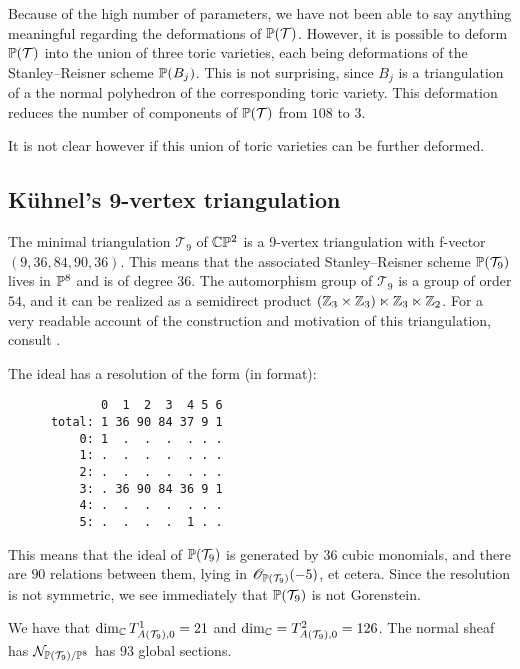 Because of the high number of parameters, we have not been able to say anything meaningful regarding the deformations of $\P(\mathcal T)$. However, it is possible to deform $\P(\mathcal T)$ into the union of three toric varieties, each being deformations of the Stanley--Reisner scheme $\P(B_j)$. This is not surprising, since $B_j$ is a triangulation of a the normal polyhedron of the corresponding toric variety. This deformation reduces the number of components of $\P(\mathcal T)$ from $108$ to $3$.

It is not clear however if this union of toric varieties can be further deformed.

\subsection{Kühnel's 9-vertex triangulation}

The minimal triangulation $\mathcal T_9$ of $\C \P^2$ is a 9-vertex triangulation with f-vector $(9,36,84,90,36)$. This means that the associated Stanley--Reisner scheme $\P(\mathcal T_9)$ lives in $\P^8$ and is of degree $36$. The automorphism group of $\mathcal T_9$ is a group of order $54$, and it can be realized as a semidirect product $(\Z_3 \times \Z_3) \ltimes \Z_3 \ltimes \Z_2$. For a very readable account of the construction and motivation of this triangulation, consult \cite{kuhnel_9vertex}.

The ideal has a resolution of the form (in \MM format):

\begin{verbatim}
             0  1  2  3  4 5 6
      total: 1 36 90 84 37 9 1
          0: 1  .  .  .  . . .
          1: .  .  .  .  . . .
          2: .  .  .  .  . . .
          3: . 36 90 84 36 9 1
          4: .  .  .  .  . . .
          5: .  .  .  .  1 . .
\end{verbatim}

This means that the ideal of $\P(\mathcal T_9)$ is generated by $36$ cubic monomials, and there are $90$ relations between them, lying in $\OO_{\P(\mathcal T_9)}(-5)$, et cetera. Since the resolution is not symmetric, we see immediately that $\P(\mathcal T_9)$ is not Gorenstein.

\begin{proposition}
We have that $\dim_\C  T^1_{A(\mathcal T_9),0}=21$ and $\dim_\C = T^2_{A(\mathcal T_9),0}=126$. The normal sheaf has $\mathcal N_{\P(\mathcal T_9)/\P^{8}}$ has $93$ global sections.
\end{proposition}

